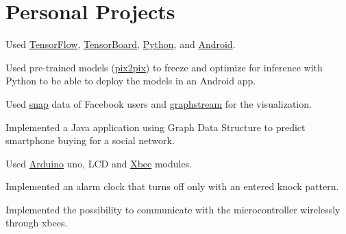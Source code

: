 \documentclass{tccv}
\begin{document}
\section{Personal Projects}

\begin{eventlist}

    
    \begin{cvitems}
    \item {Used \href{https://www.tensorflow.org}{TensorFlow}, \href{https://www.tensorflow.org/get_started/summaries_and_tensorboard}{TensorBoard}, \href{https://www.python.org}{Python}, and \href{https://developer.android.com/index.html}{Android}.}
    \item {Used pre-trained models (\href{https://github.com/affinelayer/pix2pix-tensorflow}{pix2pix}) to freeze and optimize for inference with Python to be able to deploy the models in an Android app.}
    \end{cvitems}




    {}

    \begin{cvitems}
        \item {Used \href{http://snap.stanford.edu/data/egonets-Facebook.html}{snap} data of Facebook users and \href{http://graphstream-project.org/}{graphstream} for the visualization.}
        \item {Implemented a Java application using Graph Data Structure to predict smartphone buying for a social network.}
    \end{cvitems}


    {}

    \begin{cvitems}
    \item {Used \href{https://www.arduino.cc}{Arduino} uno, LCD and \href{https://www.digi.com/xbee}{Xbee} modules.}
    \item {Implemented an alarm clock that turns off only with an entered knock pattern.}
    \item {Implemented the possibility to communicate with the microcontroller wirelessly through xbees.}
    \end{cvitems}
    



\end{eventlist}
\end{document}
